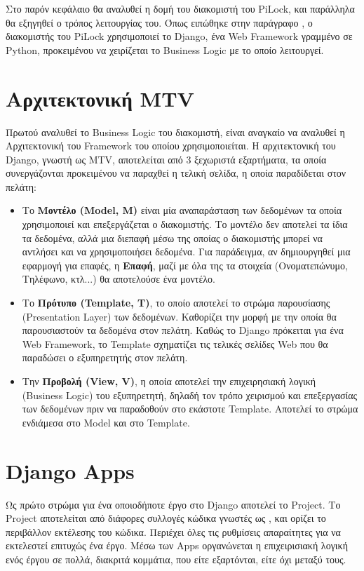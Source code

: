 \label{ch:server}
Στο παρόν κεφάλαιο θα αναλυθεί η δομή του διακομιστή του PiLock, και παράλληλα θα εξηγηθεί ο τρόπος λειτουργίας του. Όπως ειπώθηκε στην παράγραφο , ο διακομιστής του PiLock χρησιμοποιεί το Django, ένα Web Framework γραμμένο σε Python, προκειμένου να χειρίζεται το Business Logic με το οποίο λειτουργεί.

\section{Αρχιτεκτονική MTV}
	\label{sec:mtv_arch}
	Πρωτού αναλυθεί το Business Logic του διακομιστή, είναι αναγκαίο να αναλυθεί η Αρχιτεκτονική του Framework του οποίου χρησιμοποιείται. Η αρχιτεκτονική του Django, γνωστή ως MTV, αποτελείται από 3 ξεχωριστά εξαρτήματα, τα οποία συνεργάζονται προκειμένου να παραχθεί η τελική σελίδα, η οποία παραδίδεται στον πελάτη:

	\begin{itemize}
		\item Το \textbf{Μοντέλο (Model, M)} είναι μία αναπαράσταση των δεδομένων τα οποία χρησιμοποιεί και επεξεργάζεται ο διακομιστής. Το μοντέλο δεν αποτελεί τα ίδια τα δεδομένα, αλλά μια διεπαφή μέσω της οποίας ο διακομιστής μπορεί να αντλήσει και να χρησιμοποιήσει δεδομένα. Για παράδειγμα, αν δημιουργηθεί μια εφαρμογή για επαφές, η \textbf{Επαφή}, μαζί με όλα της τα στοιχεία (Ονοματεπώνυμο, Τηλέφωνο, κτλ...) θα αποτελούσε ένα μοντέλο. 
		\item Το \textbf{Πρότυπο (Template, T)}, το οποίο αποτελεί το στρώμα παρουσίασης (Presentation Layer) των δεδομένων. Καθορίζει την μορφή με την οποία θα παρουσιαστούν τα δεδομένα στον πελάτη. Καθώς το Django πρόκειται για ένα Web Framework, το Template σχηματίζει τις τελικές σελίδες Web που θα παραδώσει ο εξυπηρετητής στον πελάτη.
		\item Την \textbf{Προβολή (View, V)}, η οποία αποτελεί την επιχειρησιακή λογική (Business Logic) του εξυπηρετητή, δηλαδή τον τρόπο χειρισμού και επεξεργασίας των δεδομένων πριν να παραδοθούν στο εκάστοτε Template. Αποτελεί το στρώμα ενδιάμεσα στο Model και στο Template.
	\end{itemize}

\section{Django Apps}
	Ως πρώτο στρώμα για ένα οποιοδήποτε έργο στο Django αποτελεί το Project. Το Project αποτελείται από διάφορες συλλογές κώδικα γνωστές ως \textbf{}, και ορίζει το περιβάλλον εκτέλεσης του κώδικα. Περιέχει όλες τις ρυθμίσεις απαραίτητες για να εκτελεστεί επιτυχώς ένα έργο. Μέσω των Apps οργανώνεται η επιχειρισιακή λογική ενός έργου σε πολλά, διακριτά κομμάτια, που είτε εξαρτόνται, είτε όχι μεταξύ τους.

